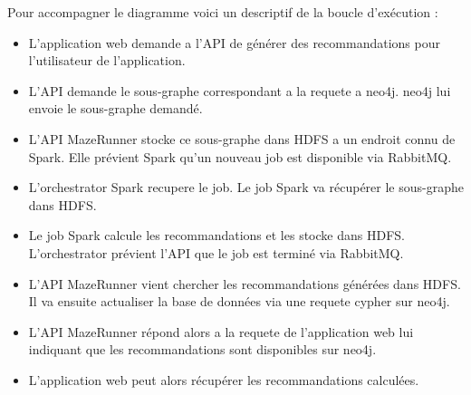 Pour accompagner le diagramme voici un descriptif de la boucle d'exécution :
\begin{itemize}
  \item L'application web demande a l'API de générer des recommandations pour l'utilisateur de l'application.
  \item L'API demande le sous-graphe correspondant a la requete a neo4j. neo4j lui envoie le sous-graphe demandé.
  \item L'API MazeRunner stocke ce sous-graphe dans HDFS a un endroit connu de Spark. Elle prévient Spark qu'un nouveau job est disponible via RabbitMQ.
  \item L'orchestrator Spark recupere le job. Le job Spark va récupérer le sous-graphe dans HDFS.
  \item Le job Spark calcule les recommandations et les stocke dans HDFS. L'orchestrator prévient l'API que le job est terminé via RabbitMQ.
  \item L'API MazeRunner vient chercher les recommandations générées dans HDFS. Il va ensuite actualiser la base de données via une requete cypher sur neo4j.
  \item L'API MazeRunner répond alors a la requete de l'application web lui indiquant que les recommandations sont disponibles sur neo4j.
  \item L'application web peut alors récupérer les recommandations calculées.
\end{itemize}
